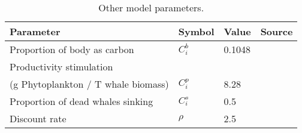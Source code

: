 \begin{table}

\caption{\label{tab:global_params}Other model parameters.}
\centering
\begin{tabular}[t]{llll}
\toprule
Parameter & Symbol & Value & Source\\
\midrule
Proportion of body as carbon & $C_i^b$ & 0.1048 & \cite{jelmert1996whaling}\\
Productivity stimulation\\(g Phytoplankton / T whale biomass) & $C_i^p$ & 8.28 & \cite{savoca2021baleen}\\
Proportion of dead whales sinking & $C_i^s$ & 0.5 & \cite{jelmert1996whaling}\\
Discount rate & $\rho$ & 2.5%
\bottomrule
\end{tabular}
\end{table}